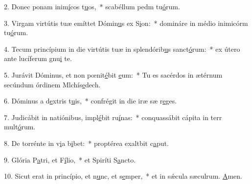 2. Donec ponam inim\uline{í}cos t\uline{u}os,~* scabéllum pedm tu\uline{ó}rum.\par 
3. Virgam virtútis tuæ emíttet Dómin\uline{u}s ex S\uline{i}on:~* domináre in médio inimicórm tu\uline{ó}rum.\par 
4. Tecum princípium in die virtútis tuæ in splendórib\uline{u}s sanct\uline{ó}rum:~* ex útero ante lucíferum gnu\uline{i} te.\par 
5. Jurávit Dóminus, et non pœnit\uline{é}bit \uline{e}um:~* Tu es sacérdos in ætérnum secúndum órdinem Mlchís\uline{e}dech.\par 
6. Dóminus a d\uline{e}xtris t\uline{u}is,~* confrégit in die iræ sæ r\uline{e}ges.\par 
7. Judicábit in natiónibus, impl\uline{é}bit ru\uline{í}nas:~* conquassábit cápita in terr mult\uline{ó}rum.\par 
8. De torrénte in v\uline{i}a b\uline{i}bet:~* proptérea exaltbit c\uline{a}put.\par 
9. Glória P\uline{a}tri, et F\uline{í}lio,~* et Spiríti S\uline{a}ncto.\par 
10. Sicut erat in princípio, et n\uline{u}nc, et s\uline{e}mper,~* et in sǽcula sæculrum. \uline{A}men.\par 
